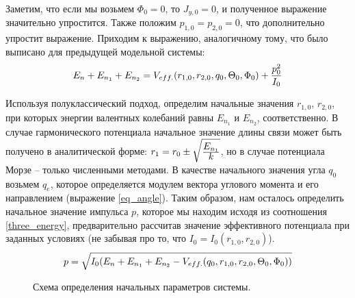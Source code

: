 Заметим, что если мы возьмем $\Phi_0 = 0$, то $J_{y, 0} = 0$, и полученное выражение значительно упростится. Также положим $p_{1,0} = p_{2,0} = 0$, что дополнительно упростит выражение.
Приходим к выражению, аналогичному тому, что было выписано для предыдущей модельной системы:
\vverh
\begin{gather}
E_n + E_{n_1} + E_{n_2} = V_{eff.}(r_{1,0}, r_{2,0}, q_0, \Theta_0, \Phi_0) + \frac{p_0^2}{I_0} \notag
\label{three_energy}
\end{gather}

Используя полуклассический подход, определим начальные значения $r_{1, 0}$, $r_{2, 0}$, при которых энергии валентных колебаний равны $E_{n_1}$ и $E_{n_2}$, соответственно. В случае гармонического потенциала начальное значение длины связи может быть получено в аналитической форме:  $r_1 = r_0 \pm \sqrt{\frac{\displaystyle E_{n_1}}{\displaystyle k}}$, но в случае потенциала Морзе -- только численными методами. 
В качестве начального значения угла $q_0$ возьмем $q_e$, которое определяется модулем вектора углового момента и его направлением (выражение \eqref{eq_angle}). Таким образом, нам осталось определить начальное значение импульса $p$, которое мы находим исходя из соотношения \eqref{three_energy}, предварительно рассчитав значение эффективного потенциала при заданных условиях (не забывая про то, что $I_0 = I_0 (r_{1,0}, r_{2,0})$).
\vverh
\begin{gather}
p = \sqrt{I_0 (E_n + E_{n_1} + E_{n_2} - V_{eff.} (q_0, r_{1,0}, r_{2,0}, \Theta_0, \Phi_0))} \notag
\end{gather}

\vverh
\begin{figure}[H]
  \begin{center}
    \caption{Схема определения начальных параметров системы.}
  \end{center}
\end{figure}

